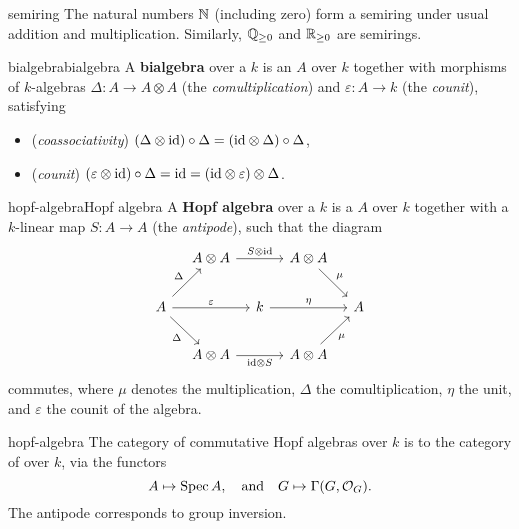\begin{example}{semiring}
    The natural numbers $\mathbb{N}$ (including zero) form a semiring under usual addition and multiplication. Similarly, $\mathbb{Q}_{\ge 0}$ and $\mathbb{R}_{\ge 0}$ are semirings.
\end{example}

\begin{topic}{bialgebra}{bialgebra}
    A \textbf{bialgebra} over a  $k$ is an  $A$ over $k$ together with morphisms of $k$-algebras $\Delta : A \to A \otimes A$ (the \textit{comultiplication}) and $\varepsilon : A \to k$ (the \textit{counit}), satisfying
    \begin{itemize}
        \item (\textit{coassociativity}) $(\Delta \otimes \text{id}) \circ \Delta = (\text{id} \otimes \Delta) \circ \Delta$,
        \item (\textit{counit}) $(\varepsilon \otimes \text{id}) \circ \Delta = \text{id} = (\text{id} \otimes \varepsilon) \otimes \Delta$.
    \end{itemize}
\end{topic}

\begin{topic}{hopf-algebra}{Hopf algebra}
    A \textbf{Hopf algebra} over a  $k$ is a  $A$ over $k$ together with a $k$-linear map $S : A \to A$ (the \textit{antipode}), such that the diagram
    \[ \begin{tikzcd}[column sep=1em, row sep=2em] & A \otimes A \arrow{rr}{S \otimes \id} && A \otimes A \arrow{dr}{\mu} & \\ A \arrow{rr}{\varepsilon} \arrow{ur}{\Delta} \arrow[swap]{dr}{\Delta} && k \arrow{rr}{\eta} && A \\ & A \otimes A \arrow[swap]{rr}{\id \otimes S} && A \otimes A \arrow[swap]{ur}{\mu} &  \end{tikzcd} \]
    commutes, where $\mu$ denotes the multiplication, $\Delta$ the comultiplication, $\eta$ the unit, and $\varepsilon$ the counit of the algebra.
\end{topic}

\begin{example}{hopf-algebra}
    The category of commutative  Hopf algebras over $k$ is  to the category of   over $k$, via the functors
    \[ A \mapsto \operatorname{Spec} A, \quad \text{and} \quad G \mapsto \Gamma(G, \mathcal{O}_G) . \]
    The antipode corresponds to group inversion.
\end{example}

